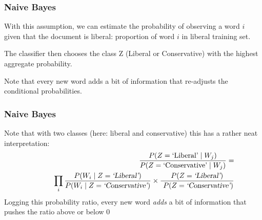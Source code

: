 \documentclass[11pt,compress,professionalfonts]{beamer}
\newcommand{\ita}{\begin{itemize}}
\newcommand{\itm}{\item[]}
\newcommand{\itz}{\end{itemize}}
\begin{document}
\begin{frame}[t,fragile]\frametitle{Naive Bayes}

With this assumption, we can estimate the probability of observing a word $i$  given that the document is liberal: proportion of word $i$ in liberal training set.

The classifier then  chooses the class Z (Liberal or Conservative) with the highest aggregate probability.

Note that every new word adds a bit of information that re-adjusts the conditional probabilities.

\newpage


\end{frame}
\begin{frame}[t,fragile]\frametitle{Naive Bayes}



Note that with two classes (here: liberal and conservative)  this has a rather neat interpretation:
\begin{align*}
\frac{P(Z=\text{`Liberal'} \mid W_j)}
{P(Z=\text{`Conservative'} \mid W_j)} = \\
~~~~~~~~~\prod_i \frac{P(W_i \mid Z=\textsl{`Liberal'})}
{P(W_i \mid Z=\textsl{`Conservative'})}\times \frac{P(Z=\textsl{`Liberal'})}{~P(Z=\textsl{`Conservative'})}
\end{align*}
Logging this probability ratio, every new word \textsl{adds} a bit of information that pushes the ratio above or below 0
%
%
%
%
%
%
%
%
%
%
%
%
%
%
%
%
%
%
%


\end{frame}
\end{document}
